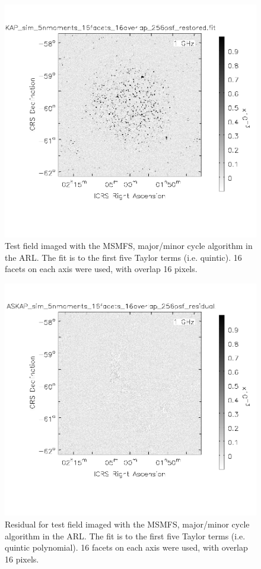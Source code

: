 \documentclass[11pt,a4paper,variablewidth]{article}
\begin{document}
\begin{figure}[H]
  \centering
  \includegraphics[width=\textwidth]{./pngs/ASKAP_sim_restored.png}
  \caption{Test field imaged with the MSMFS, major/minor cycle algorithm in the ARL. The fit is to the first five Taylor terms (i.e. quintic). 16 facets on each axis were used, with overlap 16 pixels.}
  \label{fig:ASKAP_sim_restored}
\end{figure}

\begin{figure}[H]
  \centering
  \includegraphics[width=\textwidth]{./pngs/ASKAP_sim_residual.png}
  \caption{Residual for test field imaged with the MSMFS, major/minor cycle algorithm in the ARL. The fit is to the first five Taylor terms (i.e. quintic polynomial). 16 facets on each axis were used, with overlap 16 pixels.}
  \label{fig:ASKAP_sim_residual}
\end{figure}
\end{document}
